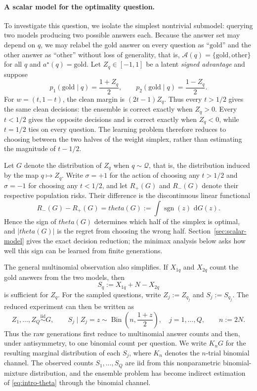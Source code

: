 \documentclass[11pt]{article}
\def\theta{theta}%
\newcommand{\sgn}{\operatorname{sgn}}
\newcommand{\Bin}{\operatorname{Bin}}
\newcommand{\calQ}{\mathcal Q}
\newcommand{\dd}{\,\mathrm d}
\begin{document}
\paragraph{A scalar model for the optimality question.}
To investigate this question, we isolate the simplest nontrivial submodel: querying two models producing two possible answers each.  Because the answer set may depend on $q$, we may relabel the gold answer on every question as ``$\mathrm{gold}$'' and the other answer as ``$\mathrm{other}$'' without loss of generality, that is, $\mathcal A(q) = \{\mathrm{gold}, \mathrm{other}\}$ for all $q$ and $a^\star(q) = \mathrm{gold}$.  Let $Z_q\in[-1,1]$ be a latent \emph{signed advantage} and suppose
\begin{equation}
\label{eq:intro-antisymmetric}
p_1(\mathrm{gold}\mid q)=\frac{1+Z_q}{2},
\qquad
p_2(\mathrm{gold}\mid q)=\frac{1-Z_q}{2}.
\end{equation}
For $w=(t,1-t)$, the clean margin is $(2t-1)Z_q$.  Thus every $t>1/2$ gives the same clean decisions: the ensemble is correct exactly when $Z_q>0$.  Every $t<1/2$ gives the opposite decisions and is correct exactly when $Z_q<0$, while $t=1/2$ ties on every question.  The learning problem therefore reduces to choosing between the two halves of the weight simplex, rather than estimating the magnitude of $t-1/2$.

Let $G$ denote the distribution of $Z_q$ when $q\sim\calQ$, that is, the distribution induced by the map $q\mapsto Z_q$.  Write $\sigma=+1$ for the action of choosing any $t>1/2$ and $\sigma=-1$ for choosing any $t<1/2$, and let $R_+(G)$ and $R_-(G)$ denote their respective population risks.  Their difference is the discontinuous linear functional
\begin{equation}
\label{eq:intro-theta}
R_-(G)-R_+(G)
=
\theta(G)
:=
\int\sgn(z)\,\dd G(z).
\end{equation}
Hence the sign of $\theta(G)$ determines which half of the simplex is optimal, and $|\theta(G)|$ is the regret from choosing the wrong half.  Section~\ref{sec:scalar-model} gives the exact decision reduction; the minimax analysis below asks how well this sign can be learned from finite generations.

The general multinomial observation also simplifies.  If $X_{1q}$ and $X_{2q}$ count the gold answers from the two models, then
\[
S_q:=X_{1q}+N-X_{2q}
\]
is sufficient for $Z_q$.  For the sampled questions, write $Z_j:=Z_{q_j}$ and $S_j:=S_{q_j}$.  The reduced experiment can then be written as
\begin{equation}
\label{eq:intro-binomial-channel}
Z_1,\ldots,Z_Q\overset{\mathrm{iid}}{\sim}G,
\qquad
S_j\mid Z_j=z
\sim
\Bin\left(n,\frac{1+z}{2}\right),
\quad j=1,\ldots,Q,
\qquad n:=2N.
\end{equation}
Thus the raw generations first reduce to multinomial answer counts and then, under antisymmetry, to one binomial count per question.  We write $K_nG$ for the resulting marginal distribution of each $S_j$, where $K_n$ denotes the $n$-trial binomial channel.  The observed counts $S_1,\ldots,S_Q$ are iid from this nonparametric binomial-mixture distribution, and the ensemble problem has become indirect estimation of \eqref{eq:intro-theta} through the binomial channel.
\end{document}
